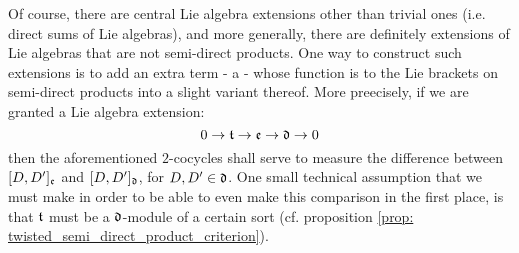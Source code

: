         Of course, there are central Lie algebra extensions other than trivial ones (i.e. direct sums of Lie algebras), and more generally, there are definitely extensions of Lie algebras that are not semi-direct products. One way to construct such extensions is to add an extra term - a  - whose function is to  the Lie brackets on semi-direct products into a slight variant thereof. More preecisely, if we are granted a Lie algebra extension:
            $$0 \to \mathfrak{t} \to \mathfrak{e} \to \mathfrak{d} \to 0$$
        then the aforementioned $2$-cocycles shall serve to measure the difference between $[D, D']_{\mathfrak{e}}$ and $[D, D']_{\mathfrak{d}}$, for $D, D' \in \mathfrak{d}$. One small technical assumption that we must make in order to be able to even make this comparison in the first place, is that $\mathfrak{t}$ must be a $\mathfrak{d}$-module of a certain sort (cf. proposition \ref{prop: twisted_semi_direct_product_criterion}). 

